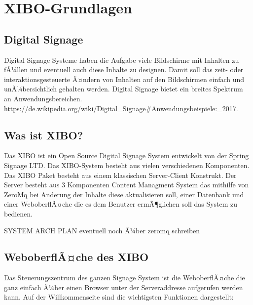 \chapter{XIBO-Grundlagen}
\section{Digital Signage}\label{sec:digitalsignage}
Digital Signage Systeme haben die Aufgabe viele Bildschirme mit Inhalten zu fÃ¼llen und eventuell auch diese Inhalte zu designen. Damit soll das zeit- oder interaktionsgesteuerte Ã¤ndern von Inhalten auf den Bildschirmen einfach und unÃ¼bersichtlich gehalten werden. Digital Signage bietet ein breites Spektrum an Anwendungsbereichen.    https://de.wikipedia.org/wiki/Digital_Signage#Anwendungsbeispiele:_2017.

\section{Was ist XIBO?}\label{sec:xibo}
Das XIBO ist ein Open Source Digital Signage System entwickelt von der Spring Signage LTD. Das XIBO-System besteht aus vielen verschiedenen Komponenten. Das XIBO Paket besteht aus einem klassischen Server-Client Konstrukt. Der Server besteht aus 3 Komponenten Content Managment System das mithilfe von ZeroMq bei Anderung der Inhalte diese aktualisieren soll, einer Datenbank und einer WeboberflÃ¤che die es dem Benutzer ermÃ¶glichen soll das System zu bedienen.

SYSTEM ARCH PLAN eventuell noch Ã¼ber zeromq schreiben

\section{WeboberflÃ¤che des XIBO}\label{sec:webpagexibo}
Das Steuerungszentrum des ganzen Signage System ist die WeboberflÃ¤che die ganz einfach Ã¼ber einen Browser unter der Serveraddresse aufgerufen werden kann. Auf der Willkommenseite sind die wichtigsten Funktionen dargestellt:

